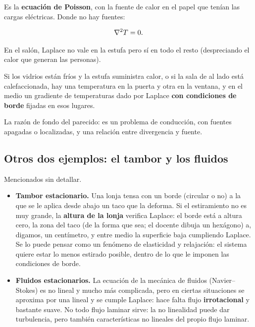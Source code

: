 \documentclass[12pt,a4paper]{article}
\begin{document}
Es la \textbf{ecuación de Poisson}, con la fuente de calor en el papel que tenían
las cargas eléctricas. Donde no hay fuentes:

\[
\laplacian  T = 0 .
\]

En el salón, Laplace no vale en la estufa pero sí en todo el resto
(despreciando el calor que generan las personas).

\begin{notebox}
Si los vidrios están fríos y
la estufa suministra calor, o si la sala de al lado está calefaccionada, hay
una temperatura en la puerta y otra en la ventana, y en el medio un gradiente
de temperaturas dado por Laplace \textbf{con condiciones de borde} fijadas en
esos lugares.
\end{notebox}

La razón de fondo del parecido: es un problema de conducción, con fuentes
apagadas o localizadas, y una relación entre divergencia y fuente.

\subsection{Otros dos ejemplos: el tambor y los fluidos}

Mencionados sin detallar.

\begin{itemize}
  \item \textbf{Tambor estacionario.} Una lonja tensa con un borde (circular o no) a la
  que se le aplica desde abajo un taco que la deforma. Si el estiramiento no es
  muy grande, la \textbf{altura de la lonja} verifica Laplace: el borde está a
  altura cero, la zona del taco (de la forma que sea; el docente dibuja un
  hexágono) a, digamos, un centímetro, y entre medio la superficie baja
  cumpliendo Laplace. Se lo puede pensar como un fenómeno de elasticidad y
  relajación: el sistema quiere estar lo menos estirado posible, dentro de lo
  que le imponen las condiciones de borde.
  \item \textbf{Fluidos estacionarios.} La ecuación de la mecánica de fluidos
  (Navier--Stokes) es no lineal y mucho más complicada, pero en ciertas
  situaciones se aproxima por una lineal y se cumple Laplace: hace falta flujo
  \textbf{irrotacional} y bastante suave. No todo flujo laminar sirve: la no
  linealidad puede dar turbulencia, pero también características no lineales
  del propio flujo laminar.
\end{itemize}
\end{document}
